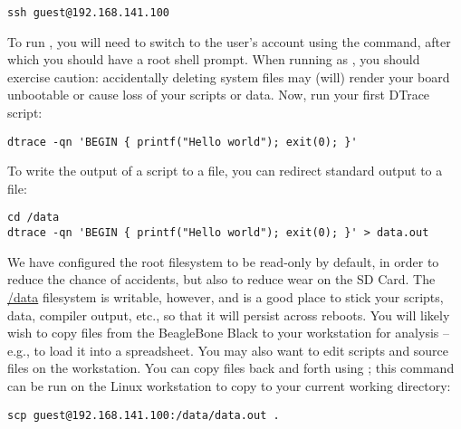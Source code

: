 \documentclass[a4paper,10pt]{article}
\begin{document}
\begin{small}
\begin{verbatim}
ssh guest@192.168.141.100
\end{verbatim}
\end{small}

To run , you will need to switch to the  user's
account using the  command, after which you should have a root shell
prompt.
When running as , you should exercise caution: accidentally
deleting system files may (will) render your board unbootable or cause loss of
your scripts or data.
Now, run your first DTrace script:

\begin{small}
\begin{verbatim}
dtrace -qn 'BEGIN { printf("Hello world"); exit(0); }'
\end{verbatim}
\end{small}

To write the output of a script to a file, you can redirect standard output to
a file:

\begin{small}
\begin{verbatim}
cd /data
dtrace -qn 'BEGIN { printf("Hello world"); exit(0); }' > data.out
\end{verbatim}
\end{small}

We have configured the root filesystem to be read-only by default, in order to
reduce the chance of accidents, but also to reduce wear on the SD Card.
The \url{/data} filesystem is writable, however, and is a good place to stick
your scripts, data, compiler output, etc., so that it will persist across
reboots.
You will likely wish to copy files from the BeagleBone Black to your
workstation for analysis -- e.g., to load it into a spreadsheet.
You may also want to edit scripts and source files on the workstation.
You can copy files back and forth using ; this command can be run on
the Linux workstation to copy  to your current working
directory:

\begin{small}
\begin{verbatim}
scp guest@192.168.141.100:/data/data.out .
\end{verbatim}
\end{small}
\end{document}

